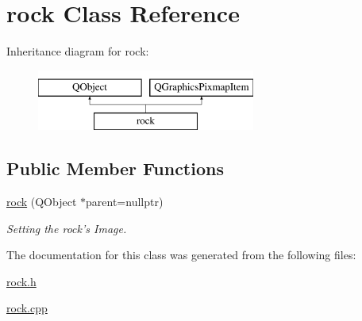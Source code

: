\hypertarget{classrock}{\section{rock Class Reference}
\label{classrock}
}
Inheritance diagram for rock\-:\begin{figure}[H]
\begin{center}
\leavevmode
\includegraphics[height=2.000000cm]{classrock}
\end{center}
\end{figure}
\subsection*{Public Member Functions}
\begin{DoxyCompactItemize}
\item 
\hypertarget{classrock_a023e10ff3627f233473609340b1d4f46}{\hyperlink{classrock_a023e10ff3627f233473609340b1d4f46}{rock} (Q\-Object $\ast$parent=nullptr)}\label{classrock_a023e10ff3627f233473609340b1d4f46}

\begin{DoxyCompactList}\small\item\em Setting the rock's Image. \end{DoxyCompactList}\end{DoxyCompactItemize}


The documentation for this class was generated from the following files\-:\begin{DoxyCompactItemize}
\item 
\hyperlink{rock_8h}{rock.\-h}\item 
\hyperlink{rock_8cpp}{rock.\-cpp}\end{DoxyCompactItemize}
